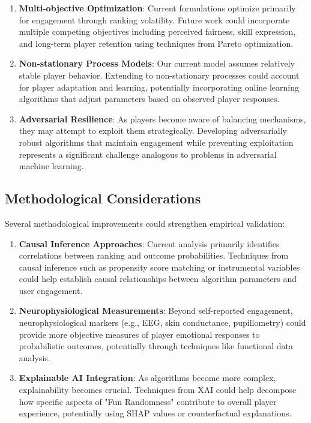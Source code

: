 \documentclass{article}
\begin{document}
\begin{enumerate}
    \item \textbf{Multi-objective Optimization}: Current formulations optimize primarily for engagement through ranking volatility. Future work could incorporate multiple competing objectives including perceived fairness, skill expression, and long-term player retention using techniques from Pareto optimization.
    
    \item \textbf{Non-stationary Process Models}: Our current model assumes relatively stable player behavior. Extending to non-stationary processes could account for player adaptation and learning, potentially incorporating online learning algorithms that adjust parameters based on observed player responses.
    
    \item \textbf{Adversarial Resilience}: As players become aware of balancing mechanisms, they may attempt to exploit them strategically. Developing adversarially robust algorithms that maintain engagement while preventing exploitation represents a significant challenge analogous to problems in adversarial machine learning.
\end{enumerate}

\subsection{Methodological Considerations}

Several methodological improvements could strengthen empirical validation:

\begin{enumerate}
    \item \textbf{Causal Inference Approaches}: Current analysis primarily identifies correlations between ranking and outcome probabilities. Techniques from causal inference such as propensity score matching or instrumental variables could help establish causal relationships between algorithm parameters and user engagement.
    
    \item \textbf{Neurophysiological Measurements}: Beyond self-reported engagement, neurophysiological markers (e.g., EEG, skin conductance, pupillometry) could provide more objective measures of player emotional responses to probabilistic outcomes, potentially through techniques like functional data analysis.
    
    \item \textbf{Explainable AI Integration}: As algorithms become more complex, explainability becomes crucial. Techniques from XAI could help decompose how specific aspects of "Fun Randomness" contribute to overall player experience, potentially using SHAP values or counterfactual explanations.
\end{enumerate}
\end{document}
